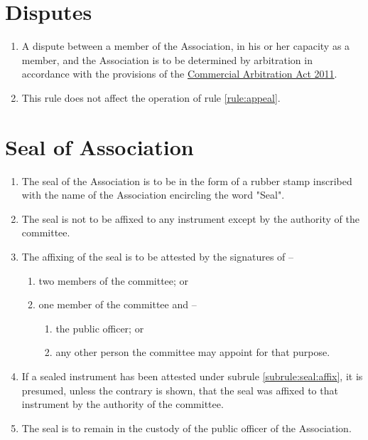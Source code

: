 \documentclass[a4paper,11pt]{article}
\begin{document}
\section{Disputes}
\label{rule:disputes}

\begin{enumerate}
	\item A dispute between a member of the Association, in his or her capacity as a member, and the Association is to be determined by arbitration in accordance with the provisions of the \href{https://www.legislation.tas.gov.au/view/html/inforce/current/act-2011-013}{Commercial Arbitration Act 2011}.
	\item This rule does not affect the operation of rule \ref{rule:appeal}.
\end{enumerate}

\section{Seal of Association}
\label{rule:seal}

\begin{enumerate}
	\item The seal of the Association is to be in the form of a rubber stamp inscribed with the name of the Association encircling the word "Seal".
	\item The seal is not to be affixed to any instrument except by the authority of the committee.
	
	\item \label{subrule:seal:affix} The affixing of the seal is to be attested by the signatures of --
	\begin{enumerate}
		\item two members of the committee; or
		\item one member of the committee and --
		\begin{enumerate}
			\item the public officer; or
			\item any other person the committee may appoint for that purpose.
		\end{enumerate}
	\end{enumerate}
	
	\item If a sealed instrument has been attested under subrule \ref{subrule:seal:affix}, it is presumed, unless the contrary is shown, that the seal was affixed to that instrument by the authority of the committee.
	\item The seal is to remain in the custody of the public officer of the Association.
\end{enumerate}
\end{document}
